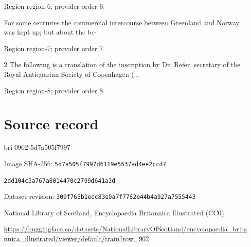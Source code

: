 \documentclass[11pt]{article}
\begin{document}
{\scriptsize\color{gray} Region region-6; provider order 6.\par}
\medskip

For some centuries the commercial intercourse between
Greenland and Norway was kept up; but about the be-
\par

{\scriptsize\color{gray} Region region-7; provider order 7.\par}
\medskip

2 The following is a translation of the inscription by Dr. Refer, secretary of the Royal Antiquarian Society of Copenhagen (...
\par

{\scriptsize\color{gray} Region region-8; provider order 8.\par}
\medskip
\newpage\section*{Source record}
bri-0902-5d7a505f7997\par
Image SHA-256: \texttt{5d7a505f7997d6119e5537ad4ee2ccd7}\par\texttt{2dd104c3a767a8014470c2799d641a3d}\par
Dataset revision: \texttt{309f765b1ecc83e0a7f7}\texttt{762e44b4a927a7555443}\par
National Library of Scotland, Encyclopaedia Britannica Illustrated (CC0).\par
\url{https://huggingface.co/datasets/NationalLibraryOfScotland/encyclopaedia_britannica_illustrated/viewer/default/train?row=902}
\end{document}
